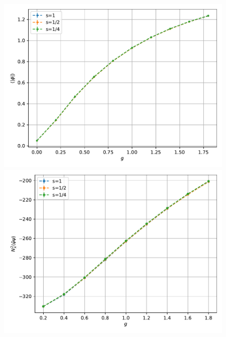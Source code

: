 \begin{figure}
    \centering
    \begin{minipage}{0.45\textwidth}
        \includegraphics[scale=0.45]{figures/rescaling/magnetisation.pdf}
    \end{minipage}
    \hfill 
    \begin{minipage}{0.45\textwidth}
        \includegraphics[scale=0.45]{figures/rescaling/condensate.pdf}
    \end{minipage}
    \begin{minipage}{0.45\textwidth}

\end{minipage}
\end{figure}
